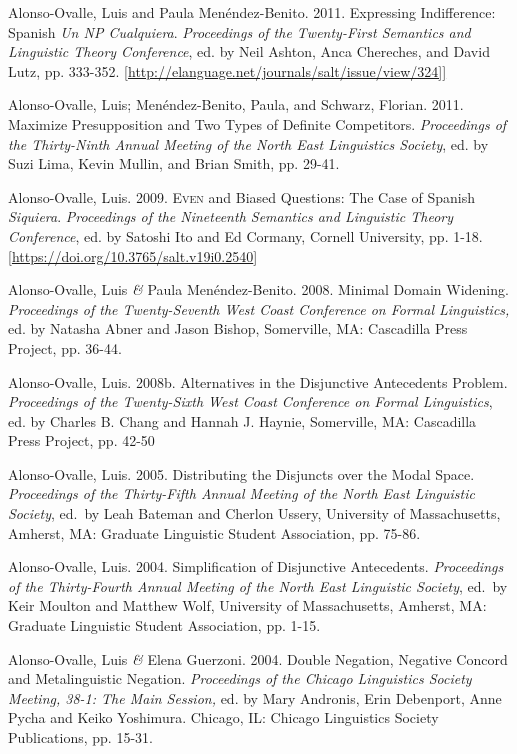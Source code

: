 \documentclass[11pt]{article}
\begin{document}
Alonso-Ovalle, Luis and Paula Men\'endez-Benito. 2011. Expressing Indifference: Spanish
\textit{Un {\em NP} Cualquiera}. \textit{Proceedings of the Twenty-First
  Semantics and Linguistic Theory Conference}, ed. by Neil Ashton,
Anca Chereches, and David Lutz, pp. 333-352. {\footnotesize [\href{http://elanguage.net/journals/salt/issue/view/324]}{http://elanguage.net/journals/salt/issue/view/324]]}}

Alonso-Ovalle, Luis; Men\'endez-Benito, Paula, and Schwarz,
Florian. 2011. Maximize Presupposition and Two Types of Definite
Competitors. \textit{Proceedings of the Thirty-Ninth Annual Meeting of the North East Linguistics
  Society}, ed. by Suzi Lima, Kevin Mullin, and Brian
Smith, pp. 29-41. 


Alonso-Ovalle, Luis. 2009. \textsc{Even} and Biased Questions: The Case of Spanish \textit{Siquiera}. \textit{Proceedings of the Nineteenth Semantics and Linguistic Theory Conference}, ed. by Satoshi Ito and Ed Cormany, Cornell University, pp. 1-18. {\footnotesize [\href{https://doi.org/10.3765/salt.v19i0.2540}{https://doi.org/10.3765/salt.v19i0.2540}]}


Alonso-Ovalle, Luis \textit{\&} Paula
    Men\'endez-Benito. 2008. Minimal Domain Widening. \textit{Proceedings of the Twenty-Seventh
    West Coast Conference on Formal Linguistics,} ed. by Natasha Abner
  and Jason Bishop,  Somerville, MA: Cascadilla Press Project,
  pp. 36-44.


Alonso-Ovalle, Luis. 2008b. Alternatives in the
  Disjunctive Antecedents Problem. \textit{Proceedings of the Twenty-Sixth
    West Coast Conference on Formal Linguistics}, ed. by Charles
  B. Chang and Hannah J. Haynie, Somerville, MA: Cascadilla Press Project, pp. 42-50


Alonso-Ovalle, Luis. 2005. Distributing the Disjuncts over the Modal Space. \textit{Proceedings of the Thirty-Fifth Annual Meeting of the North East Linguistic Society}, ed.\ by Leah Bateman and Cherlon Ussery,  University of Massachusetts, Amherst, MA: Graduate Linguistic Student Association, pp. 75-86. 

Alonso-Ovalle, Luis. 2004. Simplification of Disjunctive Antecedents. \textit{Proceedings of the Thirty-Fourth Annual Meeting of the North East Linguistic Society}, ed.\ by Keir Moulton and Matthew Wolf,  University of Massachusetts, Amherst, MA: Graduate Linguistic Student Association, pp. 1-15.


Alonso-Ovalle, Luis \textit{\&} Elena Guerzoni. 2004. Double Negation, Negative Concord and Metalinguistic Negation. \textit{Proceedings of the Chicago Linguistics Society Meeting, 38-1: The Main Session,} ed. by Mary Andronis, Erin Debenport, Anne Pycha and Keiko Yoshimura. Chicago, IL: Chicago Linguistics Society Publications, pp. 15-31.
\end{document}
